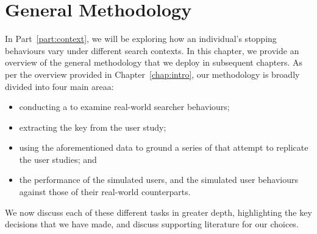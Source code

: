 
\chapter[General Methodology]{General Methodology}\label{chap:method}
In Part~\ref{part:context}, we will be exploring how an individual's stopping behaviours vary under different search contexts. In this chapter, we provide an overview of the general methodology that we deploy in subsequent chapters. As per the overview provided in Chapter~\ref{chap:intro}, our methodology is broadly divided into four main areaa:

\begin{itemize}
    \item{conducting a  to examine real-world searcher behaviours;}
    \item{extracting the key  from the user study;}
    \item{using the aforementioned data to ground a series of  that attempt to replicate the user studies; and}
    \item{ the performance of the simulated users, and  the simulated user behaviours against those of their real-world counterparts.}
\end{itemize}

We now discuss each of these different tasks in greater depth, highlighting the key decisions that we have made, and discuss supporting literature for our choices.


